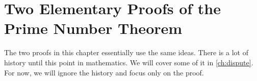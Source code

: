 \documentclass[elemannt.tex]{subfile}
\begin{document}
	\chapter{Two Elementary Proofs of the Prime Number Theorem}\label{ch:pnt}
	The two proofs in this chapter essentially use the same ideas. There is a lot of history until this point in mathematics. We will cover some of it in \autoref{ch:dispute}. For now, we will ignore the history and focus only on the proof.
\end{document}
